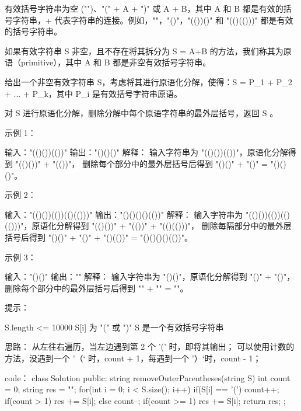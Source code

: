有效括号字符串为空 ("")、"(" + A + ")" 或 A + B，其中 A 和 B 都是有效的括号字符串，+ 代表字符串的连接。例如，""，"()"，"(())()" 和 "(()(()))" 都是有效的括号字符串。

如果有效字符串 S 非空，且不存在将其拆分为 S = A+B 的方法，我们称其为原语（primitive），其中 A 和 B 都是非空有效括号字符串。

给出一个非空有效字符串 S，考虑将其进行原语化分解，使得：S = P_1 + P_2 + ... + P_k，其中 P_i 是有效括号字符串原语。

对 S 进行原语化分解，删除分解中每个原语字符串的最外层括号，返回 S 。

 

示例 1：

输入："(()())(())"
输出："()()()"
解释：
输入字符串为 "(()())(())"，原语化分解得到 "(()())" + "(())"，
删除每个部分中的最外层括号后得到 "()()" + "()" = "()()()"。

示例 2：

输入："(()())(())(()(()))"
输出："()()()()(())"
解释：
输入字符串为 "(()())(())(()(()))"，原语化分解得到 "(()())" + "(())" + "(()(()))"，
删除每隔部分中的最外层括号后得到 "()()" + "()" + "()(())" = "()()()()(())"。

示例 3：

输入："()()"
输出：""
解释：
输入字符串为 "()()"，原语化分解得到 "()" + "()"，
删除每个部分中的最外层括号后得到 "" + "" = ""。

 

提示：

    S.length <= 10000
    S[i] 为 "(" 或 ")"
    S 是一个有效括号字符串


























思路：
从左往右遍历，当左边遇到第 2 个 '(' 时，即将其输出；
可以使用计数的方法，没遇到一个 ’（‘ 时，count + 1，每遇到一个 ’）‘时，count - 1；




























code：
class Solution {
public:
    string removeOuterParentheses(string S) {
        int count = 0;
        string res = "";
        for(int i = 0; i < S.size(); i++)
        {
            if(S[i] == '(')
            {
                count++;
                if(count > 1) res += S[i];
            }
            else
            {
                count--;
                if(count >= 1) res += S[i];
            }
        }
        return res;
    }
};